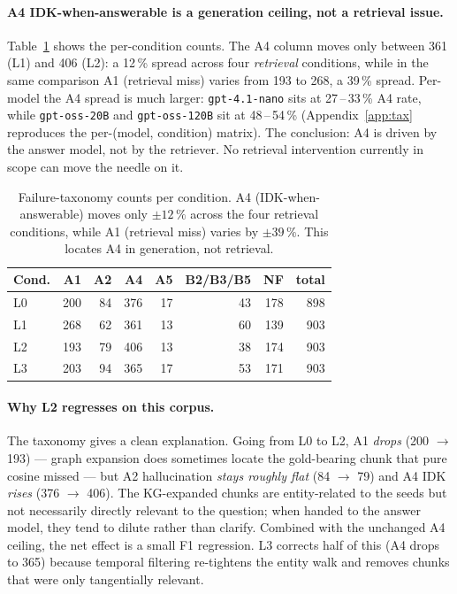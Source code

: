 \documentclass[11pt]{article}
\begin{document}
\paragraph{A4 IDK-when-answerable is a generation ceiling, not a retrieval issue.}
Table~\ref{tab:taxonomy-cond} shows the per-condition counts. The
A4 column moves only between 361 (L1) and 406 (L2): a 12\,\% spread
across four \emph{retrieval} conditions, while in the same comparison
A1 (retrieval miss) varies from 193 to 268, a 39\,\% spread. Per-model
the A4 spread is much larger: \texttt{gpt-4.1-nano} sits at
27\,--\,33\,\% A4 rate, while \texttt{gpt-oss-20B} and
\texttt{gpt-oss-120B} sit at 48\,--\,54\,\% (Appendix~\ref{app:tax}
reproduces the per-(model, condition) matrix). The conclusion: A4 is
driven by the answer model, not by the retriever. No retrieval
intervention currently in scope can move the needle on it.

\begin{table}[h]
\centering
\small
\setlength{\tabcolsep}{4pt}
\begin{tabular}{lrrrrrrr}
\toprule
Cond. & A1 & A2 & A4 & A5 & B2/B3/B5 & NF & total \\
\midrule
L0 & 200 &  84 & 376 & 17 & 43 & 178 & 898 \\
L1 & 268 &  62 & 361 & 13 & 60 & 139 & 903 \\
L2 & 193 &  79 & 406 & 13 & 38 & 174 & 903 \\
L3 & 203 &  94 & 365 & 17 & 53 & 171 & 903 \\
\bottomrule
\end{tabular}
\caption{Failure-taxonomy counts per condition. A4 (IDK-when-answerable)
moves only $\pm 12\,\%$ across the four retrieval conditions, while
A1 (retrieval miss) varies by $\pm 39\,\%$. This locates A4 in
generation, not retrieval.}
\label{tab:taxonomy-cond}
\end{table}

\paragraph{Why L2 regresses on this corpus.}
The taxonomy gives a clean explanation. Going from L0 to L2, A1
\emph{drops} (200 $\to$ 193) --- graph expansion does sometimes
locate the gold-bearing chunk that pure cosine missed --- but A2
hallucination \emph{stays roughly flat} (84 $\to$ 79) and A4 IDK
\emph{rises} (376 $\to$ 406). The KG-expanded chunks are entity-related
to the seeds but not necessarily directly relevant to the question;
when handed to the answer model, they tend to dilute rather than
clarify. Combined with the unchanged A4 ceiling, the net effect is
a small F1 regression. L3 corrects half of this (A4 drops to 365)
because temporal filtering re-tightens the entity walk and removes
chunks that were only tangentially relevant.
\end{document}
